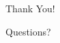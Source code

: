 \documentclass[aspectratio=169,xcolor=dvipsnames]{beamer}
\begin{document}
\begin{frame}[plain]
  \begin{center}
    {\Huge Thank You!}

    \vspace{1cm}

    {\large Questions?}
  \end{center}
\end{frame}
\end{document}
